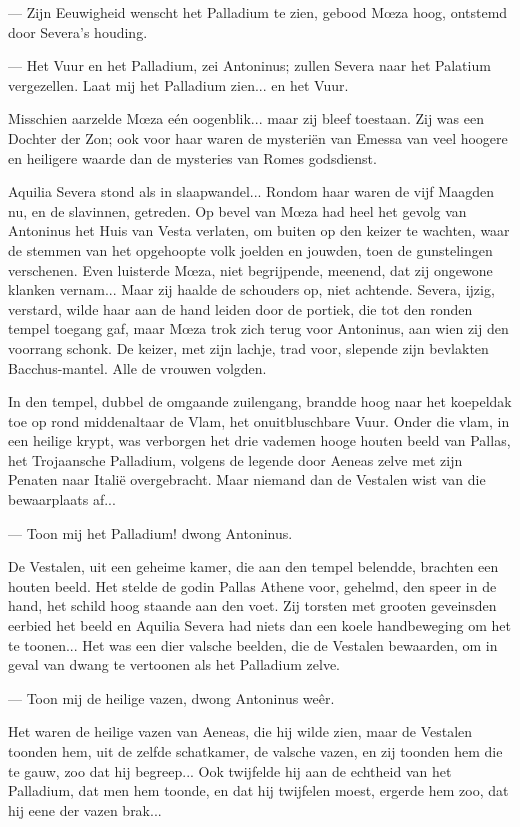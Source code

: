 \documentclass[a4paper, 12pt, oneside, dutch]{article}
\begin{document}
--- Zijn Eeuwigheid wenscht het Palladium te zien, gebood Mœza hoog, ontstemd door Severa's houding.

--- Het Vuur en het Palladium, zei Antoninus; zullen Severa naar het Palatium vergezellen. Laat mij het Palladium zien... en het Vuur.

Misschien aarzelde Mœza eén oogenblik... maar zij bleef toestaan. Zij was een Dochter der Zon; ook voor haar waren de mysteriën van Emessa van veel hoogere en heiligere waarde dan de mysteries van Romes godsdienst.

Aquilia Severa stond als in slaapwandel... Rondom haar waren de vijf Maagden nu, en de slavinnen, getreden. Op bevel van Mœza had heel het gevolg van Antoninus het Huis van Vesta verlaten, om buiten op den keizer te wachten, waar de stemmen van het opgehoopte volk joelden en jouwden, toen de gunstelingen verschenen. Even luisterde Mœza, niet begrijpende, meenend, dat zij ongewone klanken vernam... Maar zij haalde de schouders op, niet achtende. Severa, ijzig, verstard, wilde haar aan de hand leiden door de portiek, die tot den ronden tempel toegang gaf, maar Mœza trok zich terug voor Antoninus, aan wien zij den voorrang schonk. De keizer, met zijn lachje, trad voor, slepende zijn bevlakten Bacchus-mantel. Alle de vrouwen volgden.

In den tempel, dubbel de omgaande zuilengang, brandde hoog naar het koepeldak toe op rond middenaltaar de Vlam, het onuitbluschbare Vuur. Onder die vlam, in een heilige krypt, was verborgen het drie vademen hooge houten beeld van Pallas, het Trojaansche Palladium, volgens de legende door Aeneas zelve met zijn Penaten naar Italië overgebracht. Maar niemand dan de Vestalen wist van die bewaarplaats af...

--- Toon mij het Palladium! dwong Antoninus.

De Vestalen, uit een geheime kamer, die aan den tempel belendde, brachten een houten beeld. Het stelde de godin Pallas Athene voor, gehelmd, den speer in de hand, het schild hoog staande aan den voet. Zij torsten met grooten geveinsden eerbied het beeld en Aquilia Severa had niets dan een koele handbeweging om het te toonen... Het was een dier valsche beelden, die de Vestalen bewaarden, om in geval van dwang te vertoonen als het Palladium zelve.

--- Toon mij de heilige vazen, dwong Antoninus weêr.

Het waren de heilige vazen van Aeneas, die hij wilde zien, maar de Vestalen toonden hem, uit de zelfde schatkamer, de valsche vazen, en zij toonden hem die te gauw, zoo dat hij begreep... Ook twijfelde hij aan de echtheid van het Palladium, dat men hem toonde, en dat hij twijfelen moest, ergerde hem zoo, dat hij eene der vazen brak...
\end{document}
